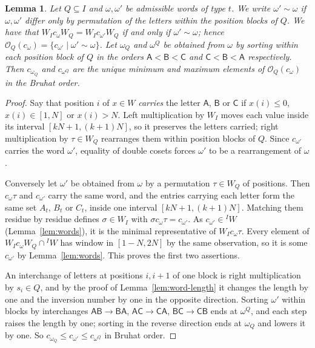 \documentclass[11pt,a4paper,reqno]{amsart}
\numberwithin{equation}{section}
\newtheorem{lemma}[theorem]{Lemma}
\theoremstyle{definition}
\theoremstyle{remark}
\theoremstyle{plain}
\newcommand{\A}{\mathsf A}
\newcommand{\B}{\mathsf B}
\newcommand{\CC}{\mathsf C}
\begin{document}
\begin{lemma}\label{lem:word-double-cosets}
Let $Q\subseteq I$ and 
$\omega,\omega'$ be admissible words of  type $t$.  
We write $\omega'\sim \omega$ if $\omega,\omega'$ differ only    by permutation of the 
letters within the position blocks of $Q$. 
We have that 
$W_Ic_\omega W_Q=W_Ic_{\omega'}W_Q$ if and only if $\omega'\sim \omega$;    hence  $\mathcal O_Q(c_\omega)=\{c_{\omega'}\mid \omega'\sim \omega\}$. 
Let $\omega_Q$ and $\omega^Q$ be obtained from $\omega$ by sorting within each position block of $Q$ in the orders
$\A<\B<\CC$ and $\CC<\B<\A$ respectively. Then $c_{\omega_Q}$ and $c_{\omega^Q}$ are the unique minimum and   maximum   elements of $\mathcal O_Q(c_\omega)$ in the Bruhat order. 
\end{lemma}
 \begin{proof}
Say that position $i$ of $x\in W$ \emph{carries} the letter $\A$, $\B$ or $\CC$ if $x(i)\leq0$,
$x(i)\in[1,N]$ or $x(i)>N$. Left multiplication by $W_I$ moves each value inside its interval $[kN+1,(k+1)N]$,
so it preserves the letters carried; right multiplication by $\tau\in W_Q$ rearranges them within position blocks of $Q$.
Since $c_{\omega'}$ carries the word $\omega'$, equality of double cosets forces $\omega'$ to be a rearrangement of $\omega$.

Conversely let $\omega'$ be obtained from $\omega$ by a permutation $\tau\in W_Q$ of positions. Then $c_\omega \tau$ and
$c_{\omega'}$ carry the same word, and the entries carrying each letter form the same set $A_t$, $B_t$ or $C_t$, inside one
interval $[kN+1,(k+1)N]$. Matching them residue by residue defines $\sigma\in W_I$ with $\sigma c_\omega \tau=c_{\omega'}$.
As $c_{\omega'}\in{}^IW$ (Lemma~\ref{lem:words}), it is the minimal representative of $W_Ic_\omega \tau$.
Every element of $W_Ic_\omega W_Q\cap{}^IW$ has window in $[1-N,2N]$ by the same observation, so it is some $c_{\omega'}$ by
Lemma~\ref{lem:words}. This proves the first two assertions.

An interchange of letters at positions $i,i+1$ of one block is right multiplication by $s_i\in Q$, and by the proof of
Lemma~\ref{lem:word-length} it changes the length by one and the inversion number by one in the opposite direction.
Sorting $\omega'$ within blocks by interchanges $\A\B\to\B\A$, $\A\CC\to\CC\A$, $\B\CC\to\CC\B$ ends at $\omega^Q$, and each
step raises the length by one; sorting in the reverse direction ends at $\omega_Q$ and lowers it by one. So
$c_{\omega_Q}\leq c_{\omega'}\leq c_{\omega^Q}$ in Bruhat order.
\end{proof}
\end{document}
